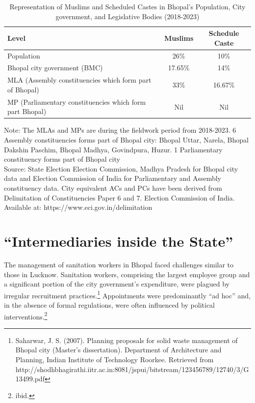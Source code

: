 \begin{table}[ht]
\centering
\caption{Representation of Muslims and Scheduled Castes in Bhopal's Population, City government, and Legislative Bodies (2018-2023)}
\label{tab:bhopal_representation}
\begin{tabular}{|l|c|c|}
\hline
\textbf{Level} & \textbf{Muslims} & \textbf{Schedule Caste} \\
\hline
Population & 26\% & 10\% \\
\hline
Bhopal city government (BMC) & 17.65\% & 14\% \\
\hline
MLA (Assembly constituencies which form part of Bhopal) & 33\% & 16.67\% \\
\hline
MP (Parliamentary constituencies which form part Bhopal) & Nil & Nil \\
\hline
\end{tabular}
\raggedright
\small Note: The MLAs and MPs are during the fieldwork period from 2018-2023. 6 Assembly constituencies forms part of Bhopal city: Bhopal Uttar, Narela, Bhopal Dakshin Paschim, Bhopal Madhya, Govindpura, Huzur. 1 Parliamentary constituency forms part of Bhopal city\\
\small Source: State Election Election Commission, Madhya Pradesh for Bhopal city data and Election Commission of India for Parliamentary and Assembly constituency data. City equivalent ACs and PCs have been derived from Delimitation of Constituencies Paper 6 and 7. Election Commission of India. Available at: https://www.eci.gov.in/delimitation
\end{table}

\section{``Intermediaries inside the State''}

The management of sanitation workers in Bhopal faced challenges similar to those in Lucknow. Sanitation workers, comprising the largest employee group and a significant portion of the city government's expenditure, were plagued by irregular recruitment practices.\footnote{Saharwar, J. S. (2007). Planning proposals for solid waste management of Bhopal city (Master's dissertation). Department of Architecture and Planning, Indian Institute of Technology Roorkee. Retrieved from http://shodhbhagirathi.iitr.ac.in:8081/jspui/bitstream/123456789/12740/3/G13499.pdf} Appointments were predominantly ``ad hoc'' and, in the absence of formal regulations, were often influenced by political interventions.\footnote{ibid.}

